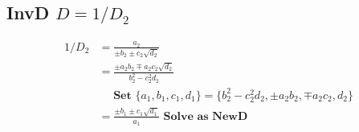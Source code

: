 \documentclass{article}
\begin{document}
\subsection{InvD $D = 1 / D_2$}
\begin{align*}
1 / D_2 &= \frac{a_2}{\pm b_2 \pm c_2\sqrt{d_2}} \\
 &= \frac{\pm a_2b_2 \mp a_2c_2\sqrt{d_2}}{b_2^2 - c_2^2d_2}\\
 &\quad \textbf{ Set } \{ a_1, b_1, c_1, d_1\} = \{ b_2^2 - c_2^2d_2, \pm a_2b_2, \mp a_2c_2, d_2\} \nonumber\\
 &= \frac{\pm b_1 \pm c_1\sqrt{d_1}}{a_1} \textbf{ Solve as NewD } \nonumber
\end{align*}




\end{document}
